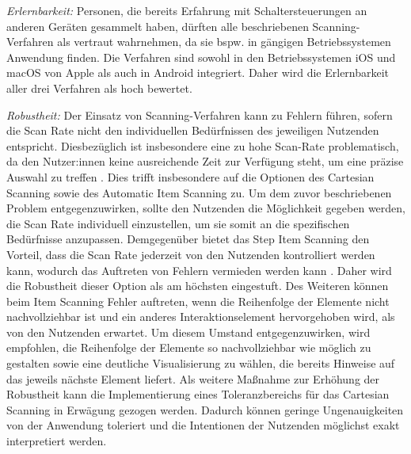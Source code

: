 \textit{Erlernbarkeit:}
Personen, die bereits Erfahrung mit Schaltersteuerungen an anderen Geräten gesammelt haben, dürften alle beschriebenen Scanning-Verfahren als vertraut wahrnehmen, da sie bspw. in gängigen Betriebssystemen Anwendung finden. Die Verfahren sind sowohl in den Betriebssystemen iOS und macOS von Apple \citep{apple_einfuhrung_2024} als auch in Android \citep{noauthor_tips_nodate} integriert. Daher wird die Erlernbarkeit aller drei Verfahren als hoch bewertet.

\textit{Robustheit:}
Der Einsatz von Scanning-Verfahren kann zu Fehlern führen, sofern die Scan Rate nicht den individuellen Bedürfnissen des jeweiligen Nutzenden entspricht. Diesbezüglich ist insbesondere eine zu hohe Scan-Rate problematisch, da den Nutzer:innen keine ausreichende Zeit zur Verfügung steht, um eine präzise Auswahl zu treffen \citep{COOK2015117}. Dies trifft insbesondere auf die Optionen des Cartesian Scanning sowie des Automatic Item Scanning zu. Um dem zuvor beschriebenen Problem entgegenzuwirken, sollte den Nutzenden die Möglichkeit gegeben werden, die Scan Rate individuell einzustellen, um sie somit an die spezifischen Bedürfnisse anzupassen. 
Demgegenüber bietet das Step Item Scanning den Vorteil, dass die Scan Rate jederzeit von den Nutzenden kontrolliert werden kann, wodurch das Auftreten von Fehlern vermieden werden kann \citep{COOK2015117}. Daher wird die Robustheit dieser Option als am höchsten eingestuft. 
Des Weiteren können beim Item Scanning Fehler auftreten, wenn die Reihenfolge der Elemente nicht nachvollziehbar ist und ein anderes Interaktionselement hervorgehoben wird, als von den Nutzenden erwartet. Um diesem Umstand entgegenzuwirken, wird empfohlen, die Reihenfolge der Elemente so nachvollziehbar wie möglich zu gestalten sowie eine deutliche Visualisierung zu wählen, die bereits Hinweise auf das jeweils nächste Element liefert.
Als weitere Maßnahme zur Erhöhung der Robustheit kann die Implementierung eines Toleranzbereichs für das Cartesian Scanning in Erwägung gezogen werden. Dadurch können geringe Ungenauigkeiten von der Anwendung toleriert und die Intentionen der Nutzenden möglichst exakt interpretiert werden.


